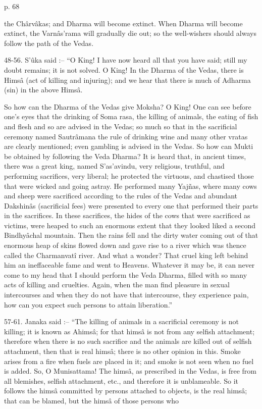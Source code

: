  

p. 68

 

the Chârvâkas; and Dharma will become extinct. When Dharma will become extinct, the Varnâs’rama will gradually die out; so the well-wishers should always follow the path of the Vedas.

 

48-56. S’ûka said :-- “O King! I have now heard all that you have said; still my doubt remains; it is not solved. O King! In the Dharma of the Vedas, there is Himsâ (act of killing and injuring); and we hear that there is much of Adharma (sin) in the above Himsâ.

 

So how can the Dharma of the Vedas give Moksha? O King! One can see before one's eyes that the drinking of Soma rasa, the killing of animals, the eating of fish and flesh and so are advised in the Vedas; so much so that in the sacrificial ceremony named Sautrâmana the rule of drinking wine and many other vratas are clearly mentioned; even gambling is advised in the Vedas. So how can Mukti be obtained by following the Veda Dharma? It is heard that, in ancient times, there was a great king, named S'as'avindu, very religious, truthful, and performing sacrifices, very liberal; he protected the virtuous, and chastised those that were wicked and going astray. He performed many Yajñas, where many cows and sheep were sacrificed according to the rules of the Vedas and abundant Dakshinâs (sacrificial fees) were presented to every one that performed their parts in the sacrifices. In these sacrifices, the hides of the cows that were sacrificed as victims, were heaped to such an enormous extent that they looked liked a second Bindhyâchal mountain. Then the rains fell and the dirty water coming out of that enormous heap of skins flowed down and gave rise to a river which was thence called the Charmanvatî river. And what a wonder? That cruel king left behind him an ineffaceable fame and went to Heavens. Whatever it may be, it can never come to my head that I should perform the Veda Dharma, filled with so many acts of killing and cruelties. Again, when the man find pleasure in sexual intercourses and when they do not have that intercourse, they experience pain, how can you expect such persons to attain liberation.”

 

57-61. Janaka said :-- “The killing of animals in a sacrificial ceremony is not killing; it is known as Ahimsâ; for that himsâ is not from any selfish attachment; therefore when there is no such sacrifice and the animals are killed out of selfish attachment, then that is real himsâ; there is no other opinion in this. Smoke arises from a fire when fuels are placed in it; and smoke is not seen when no fuel is added. So, O Munisattama! The himsâ, as prescribed in the Vedas, is free from all blemishes, selfish attachment, etc., and therefore it is unblameable. So it follows the himsâ committed by persons attached to objects, is the real himsâ; that can be blamed, but the himsâ of those persons who

